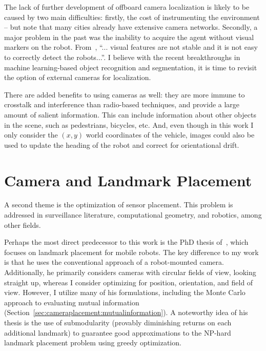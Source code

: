 \documentclass[a4paper,12pt,twoside,openright]{report}
\begin{document}
The lack of further development of offboard camera localization
is likely to be caused by two main difficulties: 
firstly, the cost of instrumenting the environment -- but note
that many cities already have extensive camera networks.
Secondly, a major problem in the past was the inability to acquire
the agent without visual markers on the robot. From~\cite{menegatti2005distributed}, 
``... visual features are not stable and it is not easy to correctly detect the robots...''. 
I believe with the recent breakthroughs in machine learning-based object recognition 
and segmentation, it is time to revisit the option of external cameras for localization. 

There are added benefits to using cameras as well: they are more immune
to crosstalk and interference than radio-based techniques, and provide
a large amount of salient information. This can include 
information about other objects in the scene, such as pedestrians,
bicycles, etc. And, even though in this work I only consider
the $(x,y)$ world coordinates of the vehicle, images could also be used
to update the heading of the robot and correct for orientational drift.






\section{Camera and Landmark Placement}

A second theme is the optimization of sensor placement. This problem is addressed
in surveillance literature, computational geometry, and robotics, among other fields.

Perhaps the most direct predecessor to this work is the PhD thesis of~\citeauthor{beinhofer2014landmark}\cite{beinhofer2014landmark},
which focuses on landmark placement for mobile robots. The key difference to my work
is that he uses the conventional approach of a robot-mounted camera.
Additionally, he primarily considers cameras with circular fields of view, looking
straight up, whereas I consider optimizing for position, orientation,
and field of view. However, I utilize many of his formulations, including
the Monte Carlo approach to evaluating mutual information (Section~\ref{sec:cameraplacement:mutualinformation}).
A noteworthy idea of his thesis is the use of submodularity (provably diminishing returns
on each additional landmark) to guarantee good approximations to the NP-hard landmark placement problem 
using greedy optimization.
\end{document}
